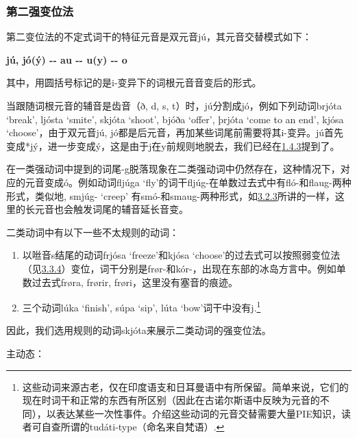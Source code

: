 \subsubsection{第二强变位法}\label{ux7b2cux4e8cux5f3aux53d8ux4f4dux6cd5}

第二变位法的不定式词干的特征元音是双元音jú，其元音交替模式如下：

\textbf{jú, jó(ý) -\/- au -\/- u(y) -\/- o}

其中，用圆括号标记的是i-变异下的词根元音音变后的形式。

当跟随词根元音的辅音是齿音（ð, d, s,
t）时，jú分割成jó，例如下列动词brjóta `break‌', ljósta `smite‌', skjóta
`shoot‌', bjóða `offer‌', þrjóta `come to an end‌', kjósa
`choose‌'，由于双元音jú,
jó都是后元音，再加某些词尾前需要将其i-变异。jú首先变成*jý，进一步变成ý，这是由于j在y前规则地脱去，我们已经在\hyperref[ux534aux5143ux97f3ux7684ux4fddux6301ux6027]{1.4.3}提到了。

在一类强动词中提到的词尾-g脱落现象在二类强动词中仍然存在，这种情况下，对应的元音变成ó。例如动词fljúga
`fly‌'的词干fljúg-在单数过去式中有fló-和flaug-两种形式，类似地, smjúg-
`creep‌'
有smó-和smaug-两种形式，如\hyperref[ux7b2cux4e00ux5f3aux53d8ux4f4dux6cd5]{3.2.3}所讲的一样，这里的长元音也会触发词尾的辅音延长音变。

二类动词中有以下一些不太规则的动词：

\begin{enumerate}
\def\labelenumi{\arabic{enumi})}
\item
  以咝音s结尾的动词frjósa `freeze‌'和kjósa
  `choose‌'的过去式可以按照弱变位法（见\hyperref[ux7b2cux4e8cux5f31ux53d8ux4f4dux6cd5]{3.3.4}）变位，词干分别是frør-和kór-，出现在东部的冰岛方言中。例如单数过去式frøra,
  frørir, frøri，这里没有塞音的痕迹。
\item
  三个动词lúka `finish‌', súpa `sip‌', lúta `bow‌'词干中没有j.\footnote{这些动词来源古老，仅在印度语支和日耳曼语中有所保留。简单来说，它们的现在时词干和正常的东西有所区别（因此在古诺尔斯语中反映为元音的不同），以表达某些一次性事件。介绍这些动词的元音交替需要大量PIE知识，读者可自查所谓的tudáti-type（命名来自梵语）.}
\end{enumerate}

因此，我们选用规则的动词skjóta来展示二类动词的强变位法。

主动态：

